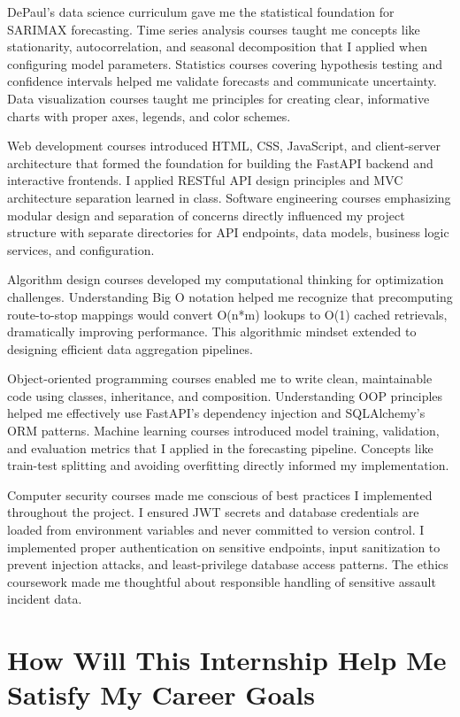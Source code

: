 \documentclass[12pt,letterpaper]{article}
\begin{document}
DePaul's data science curriculum gave me the statistical foundation for SARIMAX forecasting. Time series analysis courses taught me concepts like stationarity, autocorrelation, and seasonal decomposition that I applied when configuring model parameters. Statistics courses covering hypothesis testing and confidence intervals helped me validate forecasts and communicate uncertainty. Data visualization courses taught me principles for creating clear, informative charts with proper axes, legends, and color schemes.

Web development courses introduced HTML, CSS, JavaScript, and client-server architecture that formed the foundation for building the FastAPI backend and interactive frontends. I applied RESTful API design principles and MVC architecture separation learned in class. Software engineering courses emphasizing modular design and separation of concerns directly influenced my project structure with separate directories for API endpoints, data models, business logic services, and configuration.

Algorithm design courses developed my computational thinking for optimization challenges. Understanding Big O notation helped me recognize that precomputing route-to-stop mappings would convert O(n*m) lookups to O(1) cached retrievals, dramatically improving performance. This algorithmic mindset extended to designing efficient data aggregation pipelines.

Object-oriented programming courses enabled me to write clean, maintainable code using classes, inheritance, and composition. Understanding OOP principles helped me effectively use FastAPI's dependency injection and SQLAlchemy's ORM patterns. Machine learning courses introduced model training, validation, and evaluation metrics that I applied in the forecasting pipeline. Concepts like train-test splitting and avoiding overfitting directly informed my implementation.

Computer security courses made me conscious of best practices I implemented throughout the project. I ensured JWT secrets and database credentials are loaded from environment variables and never committed to version control. I implemented proper authentication on sensitive endpoints, input sanitization to prevent injection attacks, and least-privilege database access patterns. The ethics coursework made me thoughtful about responsible handling of sensitive assault incident data.

\section{How Will This Internship Help Me Satisfy My Career Goals}
\end{document}
